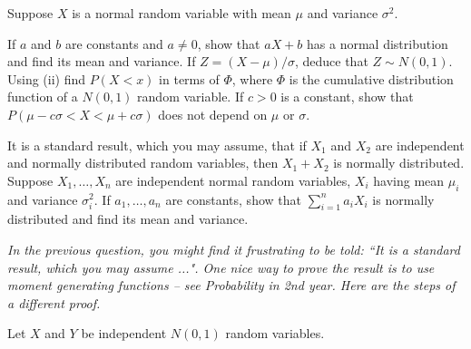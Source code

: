\documentclass[answers]{exam}
\begin{document}
\begin{questions}
\question%
Suppose $X$ is a normal random variable with mean $\mu$ and variance $\sigma^{2}$.
\begin{subparts}
\subpart If $a$ and $b$ are constants and $a\neq0$, show that $a X+b$ has a normal distribution and find its mean and variance.
\subpart If $Z=(X-\mu) / \sigma$, deduce that $Z \sim N(0,1)$.
\subpart Using (ii) find $P(X<x)$ in terms of $\Phi$, where $\Phi$ is the cumulative distribution function of a $N(0,1)$ random variable.
\subpart If $c>0$ is a constant, show that $P(\mu-c \sigma<X<\mu+c \sigma)$ does not depend on $\mu$ or $\sigma$.
\end{subparts}



\question%
It is a standard result, which you may assume, that if $X_{1}$ and $X_{2}$ are independent and normally distributed random variables, then $X_{1}+X_{2}$ is normally distributed. Suppose $X_{1}, \ldots, X_{n}$ are independent normal random variables, $X_{i}$ having mean $\mu_{i}$ and variance $\sigma_{i}^{2}$. If $a_{1}, \ldots, a_{n}$ are constants, show that $\sum_{i=1}^{n} a_{i} X_{i}$ is normally distributed and find its mean and variance.



\question%
\emph{In the previous question, you might find it frustrating to be told: ``It is a standard result, which you may assume ...". One nice way to prove the result is to use moment generating functions -- see Probability in 2nd year. Here are the steps of a different proof.}
\begin{subparts}
\subpart Let $X$ and $Y$ be independent $N(0,1)$ random variables.
\end{subparts}
\end{questions}
\end{document}
